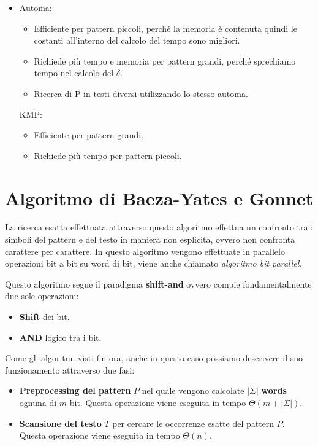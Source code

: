 \begin{itemize}
    \item Automa:
          \begin{itemize}
              \item Efficiente per pattern piccoli, perché la memoria è contenuta
                    quindi le costanti all'interno del calcolo del tempo sono
                    migliori.
              \item Richiede più tempo e memoria per pattern grandi, perché
                    sprechiamo tempo nel calcolo del $\delta$.
              \item Ricerca di P in testi diversi utilizzando lo stesso automa.
          \end{itemize}
          KMP:
          \begin{itemize}
              \item Efficiente per pattern grandi.
              \item Richiede più tempo per pattern piccoli.
          \end{itemize}
\end{itemize}
\section{Algoritmo di Baeza-Yates e Gonnet}
La ricerca esatta effettuata attraverso questo algoritmo effettua un confronto
tra i simboli del pattern e del testo in maniera non esplicita, ovvero non
confronta carattere per carattere. In questo algoritmo vengono effettuate in
parallelo operazioni bit a bit su word di bit, viene anche chiamato
\textit{algoritmo bit parallel}.

Questo algoritmo segue il paradigma \textbf{shift-and} ovvero compie fondamentalmente
due sole operazioni:
\begin{itemize}
    \item \textbf{Shift} dei bit.
    \item \textbf{AND} logico tra i bit.
\end{itemize}
Come gli algoritmi visti fin ora, anche in questo caso possiamo descrivere il suo
funzionamento attraverso due fasi:
\begin{itemize}
    \item \textbf{Preprocessing del pattern} $P$ nel quale vengono calcolate
          $|\Sigma|$ \textbf{words} ognuna di $m$ bit. Questa operazione viene
          eseguita in tempo $\Theta(m + |\Sigma|)$.
    \item \textbf{Scansione del testo} $T$ per cercare le occorrenze esatte del
          pattern $P$. Questa operazione viene eseguita in tempo $\Theta(n)$.
\end{itemize}
